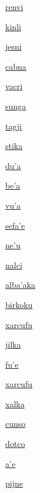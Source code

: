 {\hyperlink{val:renvi}{renvi}}{}{}{}

{\hyperlink{val:kinli}{kinli}}{}{}{}

{\hyperlink{val:jesni}{jesni}}{}{}{}

{\hyperlink{val:cabna}{cabna}}{}{}{}

{\hyperlink{val:vacri}{vacri}}{}{}{}

{\hyperlink{val:sunga}{sunga}}{}{}{}

{\hyperlink{val:tagji}{tagji}}{}{}{}

{\hyperlink{val:stika}{stika}}{}{}{}

{\hyperlink{val:duha}{du'a}}{}{}{}

{\hyperlink{val:beha}{be'a}}{}{}{}

{\hyperlink{val:vuha}{vu'a}}{}{}{}

{\hyperlink{val:sefahe}{sefa'e}}{}{}{}

{\hyperlink{val:nehu}{ne'u}}{}{}{}

{\hyperlink{val:nalci}{nalci}}{}{}{}

{\hyperlink{val:albahaka}{alba'aka}}{}{}{}

{\hyperlink{val:birkoku}{birkoku}}{}{}{}

{\hyperlink{val:xarcufu}{xarcufu}}{}{}{}

{\hyperlink{val:jilka}{jilka}}{}{}{}

{\hyperlink{val:fuhe}{fu'e}}{}{}{}

{\hyperlink{val:xarcufu}{xarcufu}}{}{}{}

{\hyperlink{val:xalka}{xalka}}{}{}{}

{\hyperlink{val:cunso}{cunso}}{}{}{}

{\hyperlink{val:dotco}{dotco}}{}{}{}

{\hyperlink{val:ahe}{a'e}}{}{}{}

{\hyperlink{val:pijne}{pijne}}{}{}{}


